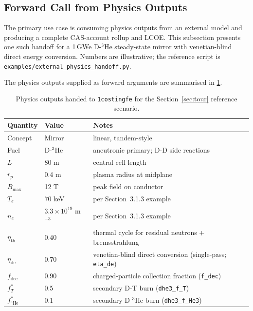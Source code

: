 \documentclass{article}
\begin{document}
\subsection{Forward Call from Physics Outputs}
\label{sec:tour-forward}

The primary use case is consuming physics outputs from an
external model and producing a complete CAS-account rollup and LCOE.
This subsection presents one such handoff for a 1\,GWe D-${}^3$He steady-state
mirror with venetian-blind direct energy conversion. Numbers are
illustrative; the reference script is
\texttt{examples/external\_physics\_handoff.py}.

The physics outputs supplied as forward arguments are summarised in
\cref{tab:tour-inputs}.

\begin{table}[htbp]
\caption{Physics outputs handed to \texttt{1costingfe} for the
Section~\ref{sec:tour} reference scenario.}
\label{tab:tour-inputs}
\centering
\begin{tabular}{lll}
\toprule
Quantity & Value & Notes \\
\midrule
Concept       & Mirror              & linear, tandem-style \\
Fuel          & D-${}^3$He          & aneutronic primary; D-D side reactions \\
$L$           & 80 m                & central cell length \\
$r_p$         & 0.4 m               & plasma radius at midplane \\
$B_{\max}$    & 12 T                & peak field on conductor \\
$T_e$         & 70 keV              & per Section~3.1.3 example \\
$n_e$         & $3.3 \times 10^{19}$ m${}^{-3}$ & per Section~3.1.3 example \\
$\eta_{\text{th}}$ & 0.40           & thermal cycle for residual neutrons + bremsstrahlung \\
$\eta_{\text{de}}$ & 0.70           & venetian-blind direct conversion (single-pass; \texttt{eta\_de}) \\
$f_{\text{dec}}$ & 0.90             & charged-particle collection fraction (\texttt{f\_dec}) \\
$f_T^*$       & 0.5                 & secondary D-T burn (\texttt{dhe3\_f\_T}) \\
$f_{{}^3\text{He}}^*$ & 0.1         & secondary D-${}^3$He burn (\texttt{dhe3\_f\_He3}) \\
\bottomrule
\end{tabular}
\end{table}
\end{document}
